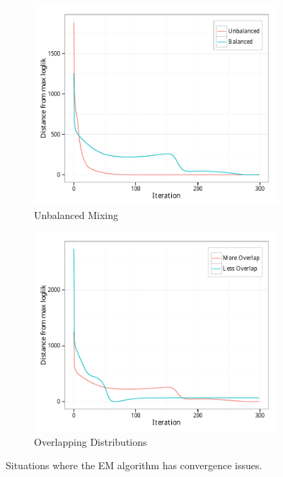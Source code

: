 \documentclass{article}
\theoremstyle{definition}
\theoremstyle{algodesc}
\begin{document}
\begin{figure}[t] \centering
  \begin{subfigure}[t]{.45\linewidth}
    \includegraphics[width=\linewidth]{include/em_imbalance.pdf}
    \caption{Unbalanced Mixing} \label{fig:em_struggles_unbal}
  \end{subfigure}
  \begin{subfigure}[t]{.45\linewidth}
    \includegraphics[width=\linewidth]{include/em_overlap.pdf}
    \caption{Overlapping Distributions} \label{fig:em_struggles_overlap}
  \end{subfigure}
  \caption{Situations where the EM algorithm has convergence issues.}
  \label{fig:em_struggles}
\end{figure}
\end{document}
